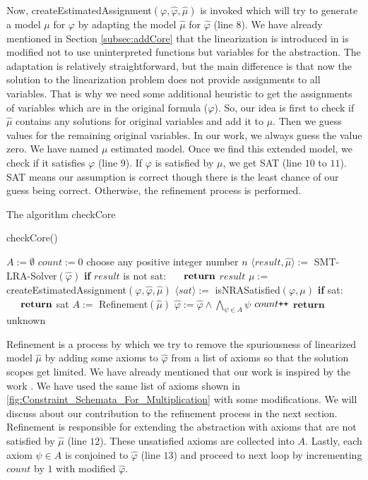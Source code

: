 \noindent Now, createEstimatedAssignment$(\varphi, \hat{\varphi}, \hat{\mu})$ is invoked which will try to generate a model $\mu$ for $\varphi$ by adapting the model $\hat{\mu}$ for $\hat{\varphi}$ (line $8$).
We have already mentioned in Section \ref{subsec:addCore} that the linearization is introduced in \cite{Cimatti:2018:ILS:3274693.3230639} is modified not to use uninterpreted functions but variables for the abstraction.
The adaptation is relatively straightforward, but the main difference is that now the solution to the linearization problem does not provide assignments to all variables.
That is why we need some additional heuristic to get the assignments of variables which are in the original formula ($\varphi$).
So, our idea is first to check if $\hat{\mu}$ contains any solutions for original variables and add it to $\mu$.
Then we guess values for the remaining original variables.
In our work, we always guess the value zero.
We have named $\mu$ estimated model.
Once we find this extended model, we check if it satisfies $\varphi$ (line $9$).
If $\varphi$ is satisfied by $\mu$, we get SAT (line $10$ to $11$).
SAT means our assumption is correct though there is the least chance of our guess being correct.
Otherwise, the refinement process is performed.\newline

\begin{algorithm}
\caption{The algorithm checkCore} 
\label{alg:checkCore}
checkCore()
\begin{algorithmic}[1]
\State $A := \emptyset$
\State $count := 0$
\State choose any positive integer number $n$ 
\State $\langle result, \hat{\mu} \rangle := $ SMT-LRA-Solver$(\hat{\varphi})$
\State \textbf{if} $result$ is not sat:
\State $\hspace{5mm} \textbf{return}$ $result$
\State $\mu := $ createEstimatedAssignment$(\varphi, \hat{\varphi}, \hat{\mu})$
\State $\langle sat \rangle := $ isNRASatisfied$(\varphi, \mu)$
\State \textbf{if} sat:
\State $\hspace{5mm} \textbf{return}$ sat
\State $A := $ Refinement$(\hat{\mu})$
\State $\hat{\varphi} := \hat{\varphi} \wedge \bigwedge\limits_{\psi \in A} \psi$
\State $count\verb!++!$
\EndWhile
\State $\textbf{return}$ unknown
\end{algorithmic}
\end{algorithm}

\noindent Refinement is a process by which we try to remove the spuriousness of linearized model $\hat{\mu}$ by adding some axioms to $\hat{\varphi}$ from a list of axioms so that the solution scopes get limited.
We have already mentioned that our work is inspired by the work \cite{Cimatti:2018:ILS:3274693.3230639}.
We have used the same list of axioms shown in \ref{fig:Constraint_Schemata_For_Multiplication} with some modifications.
We will discuss about our contribution to the refinement process in the next section.
Refinement is responsible for extending the abstraction with axioms that are not satisfied by $\hat{\mu}$ (line $12$).
These unsatisfied axioms are collected into $A$.
Lastly, each axiom $\psi \in A$ is conjoined to $\hat{\varphi}$ (line $13$) and proceed to next loop by incrementing $count$ by $1$ with modified $\hat{\varphi}$.
